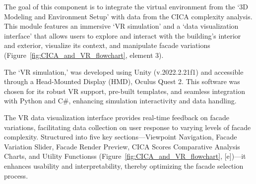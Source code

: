 %


The goal of this component is to integrate the virtual environment from the `3D Modeling and Environment Setup' with data from the CICA complexity analysis.
This module features an immersive `VR simulation' and a `data visualization interface' that allows users to explore and interact with the building's interior and exterior, visualize its context, and manipulate facade variations (Figure~\ref{fig:CICA_and_VR_flowchart}, element 3).

The `VR simulation,' was developed using Unity (v.2022.2.21f1) and accessible through a Head-Mounted Display (HMD), Oculus Quest 2.
This software was chosen for its robust VR support, pre-built templates, and seamless integration with Python and C\#, enhancing simulation interactivity and data handling.

The VR data visualization interface provides real-time feedback on facade variations, facilitating data collection on user response to varying levels of facade complexity.
Structured into five key sections—Viewpoint Navigation, Facade Variation Slider, Facade Render Preview, CICA Scores Comparative Analysis Charts, and Utility Functionss (Figure~\ref{fig:CICA_and_VR_flowchart}, [e])—it enhances usability and interpretability, thereby optimizing the facade selection process.





